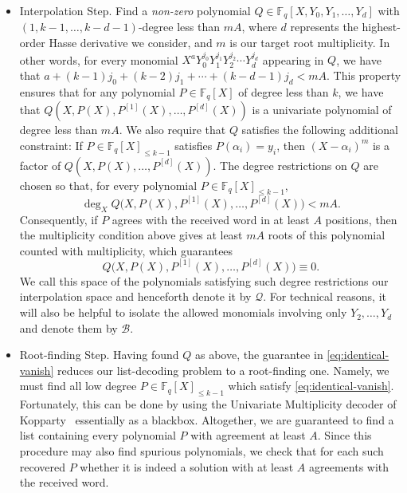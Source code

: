 \documentclass[11pt]{article}
\newcommand{\F}{\mathbb F}
\begin{document}
\begin{itemize}
    \item[1.] {Interpolation Step}. Find a \emph{non-zero} polynomial $Q\in\F_q[X,Y_0,Y_1,\dots,Y_d]$ with $(1,k-1,\dots,k-d-1)$-degree less than $mA$, where $d$ represents the highest-order Hasse derivative we consider, and $m$ is our target root multiplicity. In other words, for every monomial $X^aY_0^{j_0}Y_1^{j_1}Y_2^{j_2}\cdots Y_d^{j_d}$ appearing in $Q$, we have that $a+(k-1)j_0+(k-2)j_1+\cdots+(k-d-1)j_d < mA$.
    This property ensures that for any polynomial $P \in \F_q[X]$ of degree less than $k$, we have that $Q(X, P(X), P^{[1]}(X), \hdots, P^{[d]}(X))$ is a univariate polynomial of degree less than $mA$.
    We also require that $Q$ satisfies the following additional constraint: If $P\in\F_q[X]_{\leq k-1}$ satisfies $P(\alpha_i)=y_i$, then $(X-\alpha_i)^m$ is a factor of $Q(X,P(X),\dots,P^{[d]}(X))$. The degree restrictions on $Q$ are chosen so that, for every polynomial
$P\in\F_q[X]_{\le k-1}$,
\[
\deg_X Q\bigl(X,P(X),P^{[1]}(X),\ldots,P^{[d]}(X)\bigr)<mA.
\]
Consequently, if $P$ agrees with the received word in at least $A$ positions,
then the multiplicity condition above gives at least $mA$ roots of this polynomial counted with
multiplicity, which guarantees
\begin{equation} \label{eq:identical-vanish}
Q\bigl(X,P(X),P^{[1]}(X),\ldots,P^{[d]}(X)\bigr)\equiv0.
\end{equation}
We call this space of the polynomials satisfying such degree restrictions our interpolation space and henceforth denote it by $\mathcal Q$. For technical reasons, it will also be helpful to isolate the allowed monomials involving only $Y_2,\ldots, Y_d$ and denote them by $\mathcal{B}$.
    
\item[2.] Root-finding Step. Having found $Q$ as above, the guarantee in \eqref{eq:identical-vanish} reduces our list-decoding problem to a root-finding one. Namely, we must find all low degree $P\in\F_q[X]_{\leq k-1}$ which satisfy \eqref{eq:identical-vanish}. Fortunately, this can be done by using the Univariate Multiplicity decoder of Kopparty~\cite{Kopparty2015} essentially as a blackbox. Altogether, we are guaranteed to find a list containing every polynomial $P$ with agreement at least $A$. Since this procedure may also find spurious polynomials, we check that for each such recovered $P$ whether it is indeed a solution with at least $A$ agreements with the received word.
\end{itemize}
\end{document}
